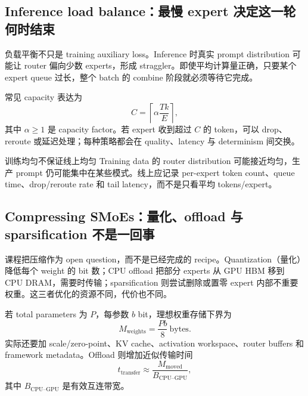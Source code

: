 \subsection{Inference load balance：最慢 expert 决定这一轮何时结束}

负载平衡不只是 training auxiliary loss。Inference 时真实 prompt distribution 可能让 router 偏向少数 experts，形成 straggler。即使平均计算量正确，只要某个 expert queue 过长，整个 batch 的 combine 阶段就必须等待它完成。


常见 capacity 表达为
\[
C=\left\lceil \alpha\frac{Tk}{E}\right\rceil,
\]
其中 $\alpha\ge 1$ 是 capacity factor。若 expert 收到超过 $C$ 的 token，可以 drop、reroute 或延迟处理；每种策略都会在 quality、latency 与 determinism 间交换。

\begin{warningbox}{训练均匀不保证线上均匀}
Training data 的 router distribution 可能接近均匀，生产 prompt 仍可能集中在某些模式。线上应记录 per-expert token count、queue time、drop/reroute rate 和 tail latency，而不是只看平均 tokens/expert。
\end{warningbox}


\subsection{Compressing SMoEs：量化、offload 与 sparsification 不是一回事}

课程把压缩作为 open question，而不是已经完成的 recipe。Quantization（量化）降低每个 weight 的 bit 数；CPU offload 把部分 experts 从 GPU HBM 移到 CPU DRAM，需要时传输；sparsification 则尝试删除或置零 expert 内部不重要权重。这三者优化的资源不同，代价也不同。


若 total parameters 为 $P$，每参数 $b$ bit，理想权重存储下界为
\[
M_{\text{weights}}=\frac{Pb}{8}\ \text{bytes}.
\]
实际还要加 scale/zero-point、KV cache、activation workspace、router buffers 和 framework metadata。Offload 则增加近似传输时间
\[
t_{\text{transfer}}\approx \frac{M_{\text{moved}}}{B_{\text{CPU--GPU}}},
\]
其中 $B_{\text{CPU--GPU}}$ 是有效互连带宽。

